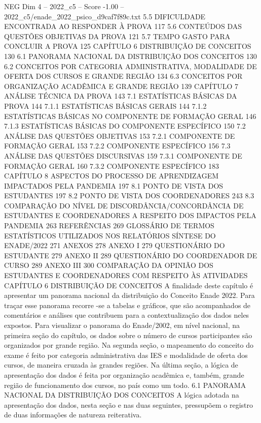 \begin{textsample}{NEG Dim 4 – 2022\_c5 – Score -1.00 – 2022\_c5/enade\_2022\_psico\_d9caf7f89c.txt}  \label{ex:f4_neg_075}
5.5 DIFICULDADE ENCONTRADA AO RESPONDER À PROVA 117 5.6 CONTEÚDOS DAS QUESTÕES OBJETIVAS DA PROVA 121 5.7 TEMPO GASTO PARA CONCLUIR A PROVA 125 CAPÍTULO 6 DISTRIBUIÇÃO DE CONCEITOS 130 6.1 PANORAMA NACIONAL DA DISTRIBUIÇÃO DOS CONCEITOS 130 6.2 CONCEITOS POR CATEGORIA ADMINISTRATIVA, MODALIDADE DE OFERTA DOS CURSOS E GRANDE REGIÃO 134 6.3 CONCEITOS POR ORGANIZAÇÃO ACADÊMICA E GRANDE REGIÃO 139 CAPÍTULO 7 ANÁLISE TÉCNICA DA PROVA 143 7.1 ESTATÍSTICAS BÁSICAS DA PROVA 144 7.1.1 ESTATÍSTICAS BÁSICAS GERAIS 144 7.1.2 ESTATÍSTICAS BÁSICAS NO COMPONENTE DE FORMAÇÃO GERAL 146 7.1.3 ESTATÍSTICAS BÁSICAS DO COMPONENTE ESPECÍFICO 150 7.2 ANÁLISE DAS QUESTÕES OBJETIVAS 153 7.2.1 COMPONENTE DE FORMAÇÃO GERAL 153 7.2.2 COMPONENTE ESPECÍFICO 156 7.3 ANÁLISE DAS QUESTÕES DISCURSIVAS 159 7.3.1 COMPONENTE DE FORMAÇÃO GERAL 160 7.3.2 COMPONENTE ESPECÍFICO 183 CAPÍTULO 8 ASPECTOS DO PROCESSO DE APRENDIZAGEM IMPACTADOS PELA PANDEMIA 197 8.1 PONTO DE VISTA DOS ESTUDANTES 197 8.2 PONTO DE VISTA DOS COORDENADORES 243 8.3 COMPARAÇÃO DO NÍVEL DE DISCORDÂNCIA/CONCORDÂNCIA DE ESTUDANTES E COORDENADORES A RESPEITO DOS IMPACTOS PELA PANDEMIA 263 REFERÊNCIAS 269 GLOSSÁRIO DE TERMOS ESTATÍSTICOS UTILIZADOS NOS RELATÓRIOS SÍNTESE DO ENADE/2022 271 ANEXOS 278 ANEXO I 279 QUESTIONÁRIO DO ESTUDANTE 279 ANEXO II 289 QUESTIONÁRIO DO COORDENADOR DE CURSO 289 ANEXO III 300 COMPARAÇÃO DA OPINIÃO DOS ESTUDANTES E COORDENADORES COM RESPEITO ÀS ATIVIDADES CAPÍTULO 6 DISTRIBUIÇÃO DE CONCEITOS A finalidade deste capítulo é apresentar um panorama nacional da distribuição do Conceito Enade 2022.
Para traçar esse panorama recorre -se a tabelas e gráficos, que são acompanhados de comentários e análises que contribuem para a contextualização dos dados neles expostos.
Para visualizar o panorama do Enade/2002, em nível nacional, na primeira seção do capítulo, os dados sobre o número de cursos participantes são organizados por grande região.
Na segunda seção, o mapeamento do conceito do exame é feito por categoria administrativa das IES e modalidade de oferta dos cursos, de maneira cruzada às grandes regiões.
Na última seção, a lógica de apresentação dos dados é feita por organização acadêmica e, também, grande região de funcionamento dos cursos, no país como um todo. 6.1 PANORAMA NACIONAL DA DISTRIBUIÇÃO DOS CONCEITOS A lógica adotada na apresentação dos dados, nesta seção e nas duas seguintes, pressupõem o registro de duas informações de natureza reiterativa.

\end{textsample}
